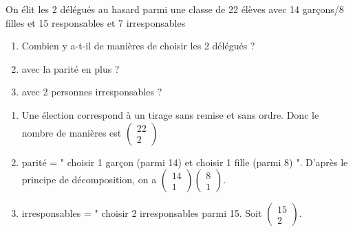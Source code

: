 \documentclass{book}
\begin{document}
\begin{Exercice}[démocratie]
On élit les 2 délégués au hasard parmi une classe de 22 élèves avec 14 garçons/8 filles et 15 responsables et 7 irresponsables
\begin{enumerate}
\item Combien y a-t-il de manières de choisir les 2 délégués ? 
\item avec la parité en plus ?
\item avec 2 personnes irresponsables ?
\end{enumerate}

\begin{Correction}
\begin{enumerate}
\item  Une élection correspond à un tirage sans remise et sans ordre. Donc le nombre de manières est $\begin{pmatrix}22\\2\end{pmatrix}$
\item parité = " choisir 1 garçon  (parmi 14) et choisir 1 fille (parmi 8) ". D'après le principe de décomposition, on a $\begin{pmatrix}14\\1\end{pmatrix}\begin{pmatrix}8\\1\end{pmatrix}$.
\item irresponsables = " choisir 2 irresponsables  parmi 15. Soit $\begin{pmatrix}15\\2\end{pmatrix}$.
\end{enumerate}
\end{Correction}
\end{Exercice}
\end{document}
